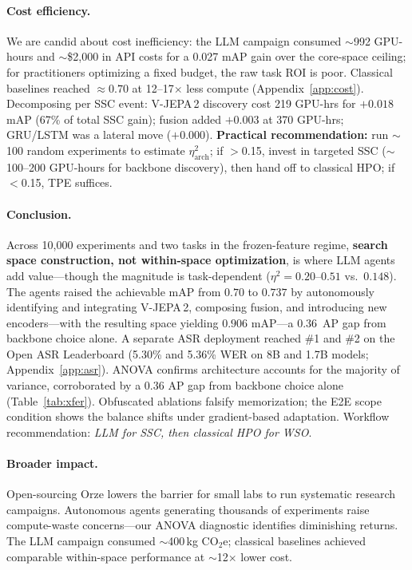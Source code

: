 \documentclass{article}
\begin{document}
\paragraph{Cost efficiency.}
We are candid about cost inefficiency: the LLM campaign consumed $\sim$992 GPU-hours and $\sim$\$2{,}000 in API costs for a 0.027 mAP gain over the core-space ceiling; for practitioners optimizing a fixed budget, the raw task ROI is poor. Classical baselines reached $\approx 0.70$ at 12--17$\times$ less compute (Appendix~\ref{app:cost}). Decomposing per SSC event: V-JEPA\,2 discovery cost 219 GPU-hrs for $+0.018$ mAP (67\% of total SSC gain); fusion added $+0.003$ at 370 GPU-hrs; GRU/LSTM was a lateral move ($+0.000$).
\textbf{Practical recommendation:} run $\sim$100 random experiments to estimate $\eta^2_{\mathrm{arch}}$; if $>$0.15, invest in targeted SSC ($\sim$100--200 GPU-hours for backbone discovery), then hand off to classical HPO; if $<$0.15, TPE suffices.

\paragraph{Conclusion.}
Across 10{,}000 experiments and two tasks in the frozen-feature regime, \textbf{search space construction, not within-space optimization}, is where LLM agents add value---though the magnitude is task-dependent ($\eta^2 = 0.20$--$0.51$ vs.\ $0.148$).
The agents raised the achievable mAP from $0.70$ to $0.737$ by autonomously identifying and integrating V-JEPA\,2, composing fusion, and introducing new encoders---with the resulting space yielding $0.906$ mAP---a 0.36~AP gap from backbone choice alone.
A separate ASR deployment reached \#1 and \#2 on the Open ASR Leaderboard (5.30\% and 5.36\% WER on 8B and 1.7B models; Appendix~\ref{app:asr}).
ANOVA confirms architecture accounts for the majority of variance, corroborated by a 0.36 AP gap from backbone choice alone (Table~\ref{tab:xfer}). Obfuscated ablations falsify memorization; the E2E scope condition shows the balance shifts under gradient-based adaptation. Workflow recommendation: \emph{LLM for SSC, then classical HPO for WSO}.

\paragraph{Broader impact.}
Open-sourcing Orze lowers the barrier for small labs to run systematic research campaigns. Autonomous agents generating thousands of experiments raise compute-waste concerns---our ANOVA diagnostic identifies diminishing returns. The LLM campaign consumed $\sim$400\,kg CO$_2$e; classical baselines achieved comparable within-space performance at $\sim$12$\times$ lower cost.
\end{document}
